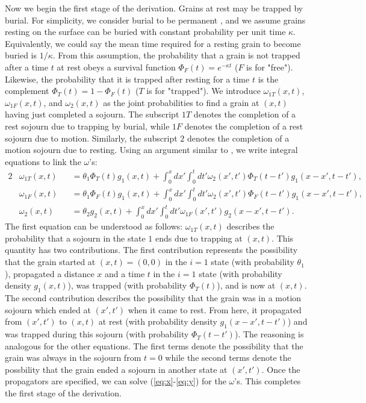\documentclass[]{agujournal2018}
\newcommand\om{\omega}
\begin{document}
Now we begin the first stage of the derivation.
Grains at rest may be trapped by burial.
For simplicity, we consider burial to be permanent \citep[e.g.][]{Wu2019}, and we assume grains resting on the surface can be buried with constant probability per unit time $\kappa$.
Equivalently, we could say the mean time required for a resting grain to become buried is $1/\kappa$.
From this assumption, the probability that a grain is not trapped after a time $t$ at rest obeys a survival function $\Phi_F(t) = e^{-\kappa t}$ ($F$ is for "free"). Likewise, the probability that it is trapped after resting for a time $t$ is the complement $\Phi_T(t) = 1-\Phi_F(t)$ ($T$ is for "trapped").
We introduce $\omega_{1T}(x,t)$, $\omega_{1F}(x,t)$, and $\omega_2(x,t)$ as the joint probabilities to find a grain at $(x,t)$ having just completed a sojourn.
The subscript ${1T}$ denotes the completion of a rest sojourn due to trapping by burial, while $1F$ denotes the completion of a rest sojourn due to motion.
Similarly, the subscript $2$ denotes the completion of a motion sojourn due to resting.
Using an argument similar to \citet{Weiss1994}, we write integral equations to link the $\omega$'s: 
\begin{alignat}{2}
&\om_{1T}(x,t) &&= \theta_1\Phi_T(t)g_1(x,t) + \int_0^x dx' \int_0^t dt' \om_2(x',t')\Phi_T(t-t')g_1(x-x',t-t')\label{eq:x},\\
&\om_{1F}(x,t) &&= \theta_1\Phi_F(t)g_1(x,t) + \int_0^x dx' \int_0^t dt' \om_2(x',t') \Phi_F(t-t') g_1(x-x',t-t'),\\
&\om_2(x,t) &&= \theta_2 g_2(x,t) + \int_0^x dx' \int_0^t dt' \om_{1F}(x',t')g_2(x-x',t-t'). \label{eq:y}
\end{alignat}
The first equation can be understood as follows: $\omega_{1T}(x,t)$ describes the probability that a sojourn in the state $1$ ends due to trapping at $(x,t)$. This quantity has two contributions. The first contribution represents the possibility that the grain started at $(x,t)=(0,0)$ in the $i=1$ state (with probability $\theta_1$), propagated a distance $x$ and a time $t$ in the $i=1$ state (with probability density $g_1(x,t)$), was trapped (with probability $\Phi_T(t)$), and is now at $(x,t)$. 
The second contribution describes the possibility that the grain was in a motion sojourn which ended at $(x',t')$ when it came to rest. From here, it propagated from $(x',t')$ to $(x,t)$ at rest (with probability density $g_1(x-x',t-t')$) and was trapped during this sojourn (with probability $\Phi_T(t-t')$).
The reasoning is analogous for the other equations. The first terms denote the possibility that the grain was always in the sojourn from $t=0$ while the second terms denote the possbility that the grain ended a sojourn in another state at $(x',t')$.
Once the propagators are specified, we can solve (\ref{eq:x}-\ref{eq:y}) for the $\omega$'s. This completes the first stage of the derivation.
\end{document}
